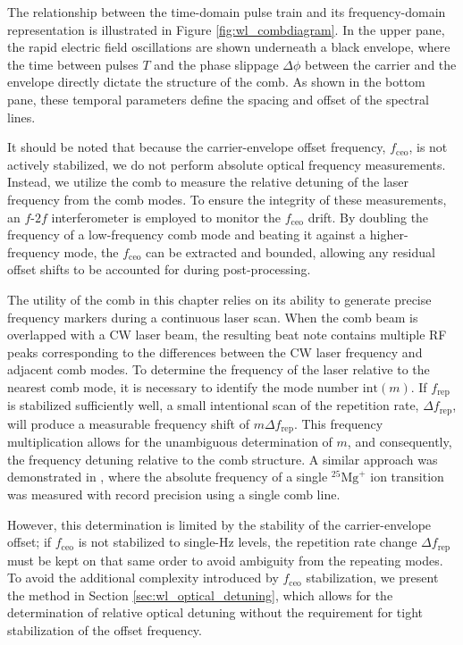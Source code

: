 \documentclass[8pt,a4paper]{report}
\begin{document}
	The relationship between the time-domain pulse train and its frequency-domain representation is illustrated in Figure \ref{fig:wl_combdiagram}. In the upper pane, the rapid electric field oscillations are shown underneath a black envelope, where the time between pulses $T$ and the phase slippage $\Delta \phi$ between the carrier and the envelope directly dictate the structure of the comb. As shown in the bottom pane, these temporal parameters define the spacing and offset of the spectral lines.
	
	It should be noted that because the carrier-envelope offset frequency, $f_\mathrm{ceo}$, is not actively stabilized, we do not perform absolute optical frequency measurements. Instead, we utilize the comb to measure the relative detuning of the laser frequency from the comb modes. To ensure the integrity of these measurements, an $f\text{-}2f$ interferometer is employed to monitor the $f_\mathrm{ceo}$ drift. By doubling the frequency of a low-frequency comb mode and beating it against a higher-frequency mode, the $f_\mathrm{ceo}$ can be extracted and bounded, allowing any residual offset shifts to be accounted for during post-processing.
	
	The utility of the comb in this chapter relies on its ability to generate precise frequency markers during a continuous laser scan. When the comb beam is overlapped with a CW laser beam, the resulting beat note contains multiple RF peaks corresponding to the differences between the CW laser frequency and adjacent comb modes. To determine the frequency of the laser relative to the nearest comb mode, it is necessary to identify the mode number $\mathrm{int}(m)$. If $f_\mathrm{rep}$ is stabilized sufficiently well, a small intentional scan of the repetition rate, $\Delta f_\mathrm{rep}$, will produce a measurable frequency shift of $m\Delta f_\mathrm{rep}$. This frequency multiplication allows for the unambiguous determination of $m$, and consequently, the frequency detuning relative to the comb structure. A similar approach was demonstrated in \cite{ours_single_mg_comb_line}, where the absolute frequency of a single $^{25}\mathrm{Mg}^+$ ion transition was measured with record precision using a single comb line.
	
	However, this determination is limited by the stability of the carrier-envelope offset; if $f_\mathrm{ceo}$ is not stabilized to single-Hz levels, the repetition rate change $\Delta f_\mathrm{rep}$ must be kept on that same order to avoid ambiguity from the repeating modes. To avoid the additional complexity introduced by $f_\mathrm{ceo}$ stabilization, we present the method in Section \ref{sec:wl_optical_detuning}, which allows for the determination of relative optical detuning without the requirement for tight stabilization of the offset frequency.
	
\end{document}
